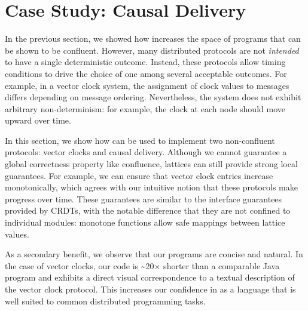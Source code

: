 \section{Case Study: Causal Delivery}
\label{sec:causal}

In the previous section, we showed how \lang increases the space of programs
that can be shown to be confluent. However, many distributed protocols are not
\emph{intended} to have a single deterministic outcome. Instead, these protocols allow timing conditions to drive the
choice of one among several acceptable outcomes. For example, in a vector clock
system, the assignment of clock values to messages differs depending on
message ordering. Nevertheless, the system does not exhibit arbitrary
non-determinism: for example, the clock at each node should move upward over time.

In this section, we show how \lang can be used to implement two non-confluent
protocols: vector clocks and causal delivery. Although we cannot guarantee a
global correctness property like confluence, lattices can still provide strong
local guarantees. For example, we can ensure that vector clock entries increase
monotonically, which agrees with our intuitive notion that these protocols make
progress over time. These guarantees are similar to the interface guarantees
provided by CRDTs, with the notable difference that they are not confined to
individual modules: monotone functions allow safe mappings between lattice
values.

As a secondary benefit, we observe that our programs are concise and natural.
In the case of vector clocks, our code is \textasciitilde{}20$\times$ shorter
than a comparable Java program and exhibits a direct visual correspondence to a
textual description of the vector clock protocol. This increases our confidence
in \lang as a language that is well suited to common distributed programming
tasks.


